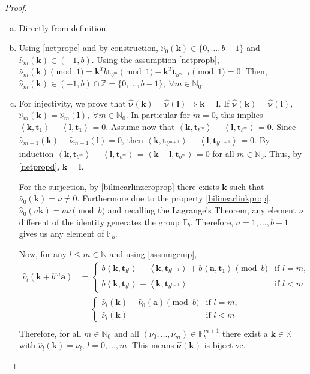 \documentclass[graybox,footinfo]{svmult}
\newcommand{\integers}{\mathbb{Z}} %
\newcommand{\naturals}{\mathbb{N}} %
\newcommand{\vt}{\boldsymbol{t}}    %
\newcommand{\natzero}{\mathbb{N}_{0}}
\newcommand{\bbK}{\mathbb{K}}
\newcommand{\bbF}{\mathbb{F}}
\newcommand{\ip}[3][{}]{\ensuremath{\left \langle #2, #3 \right \rangle_{#1}}}
\newcommand{\va}{\boldsymbol{a}}    %
\newcommand{\vk}{\boldsymbol{k}}    %
\newcommand{\vl}{\boldsymbol{l}}    %
\newcommand{\vnu}{\boldsymbol{\nu}} %
\newcommand{\hvnu}{\widehat{\vnu}}
\newcommand{\hnu}{\hat{\nu}}
\begin{document}
\begin{proof}
\begin{enumerate}[a)]
\item Directly from definition.
\item Using \eqref{netpropc} and by construction, $\hnu_0(\vk)\in\{0,\dots,b-1\}$ and $\hnu_m(\vk)\in (-1,b)$. Using the assumption \eqref{netpropb}, $\hnu_m(\vk)\pmod 1=\vk^Tb\vt_{b^m}\pmod 1-\vk^T\vt_{b^{m-1}}\pmod 1=0$. Then, $\hnu_m(\vk)\in (-1,b)\cap\integers=\{0,\dots,b-1\},\;\forall m\in\natzero$.

\item For injectivity, we prove that $\hvnu(\vk)=\hvnu(\vl) \Rightarrow \vk = \vl$. If $\hvnu(\vk)=\hvnu(\vl)$, $\hnu_m(\vk)=\hnu_m(\vl),\;\forall m\in\natzero$. In particular for $m=0$, this implies $\ip{\vk}{\vt_1}-\ip{\vl}{\vt_1}=0$. Assume now that $\ip{\vk}{\vt_{b^m}}-\ip{\vl}{\vt_{b^m}}=0$. Since $\hnu_{m+1}(\vk)-\hnu_{m+1}(\vl)=0$, then $\ip{\vk}{\vt_{b^{m+1}}}-\ip{\vl}{\vt_{b^{m+1}}}=0$. By induction $\ip{\vk}{\vt_{b^{m}}}-\ip{\vl}{\vt_{b^{m}}}=\ip{\vk-\vl}{\vt_{b^{m}}}=0$ for all $m\in\natzero$. Thus, by \eqref{netpropd}, $\vk=\vl$.

\vspace{2mm}
    For the surjection, by \eqref{bilinearlinzeroprop} there exists $\vk$ such that $\hnu_0(\vk)=\nu\neq 0$. Furthermore due to the property \eqref{bilinearlinkprop}, $\hnu_0(a\vk)=a\nu \pmod b$ and recalling the Lagrange's Theorem, any element $\nu$ different of the identity generates the group $\bbF_b$. Therefore, $a=1,...,b-1$ gives us any element of $\bbF_b$.

    Now, for any $l\leq m\in\naturals$ and using \eqref{assumgenip},
\begin{align*}
\hnu_l(\vk+b^m\va)&=
\begin{cases}
b\ip{\vk}{\vt_{b^l}}-\ip{\vk}{\vt_{b^{l-1}}}+b\ip{\va}{\vt_{1}} \pmod b  &\mbox{if } l=m, \\
b\ip{\vk}{\vt_{b^l}}-\ip{\vk}{\vt_{b^{l-1}}} &\mbox{if } l<m   \end{cases}\\
&=
\begin{cases}
\hnu_l(\vk)+\hnu_0(\va) \pmod b  &\mbox{if } l=m, \\
\hnu_l(\vk) &\mbox{if } l<m   \end{cases}\\
\end{align*}
Therefore, for all $m\in \natzero$ and all $(\nu_0,\dots,\nu_m) \in \bbF_b^{m+1}$ there exist a $\vk \in \bbK$ with $\hnu_l(\vk)=\nu_l$, $l=0,\dots,m$. This means $\hvnu(\vk)$ is bijective.


\end{enumerate}
\end{proof}
\end{document}
